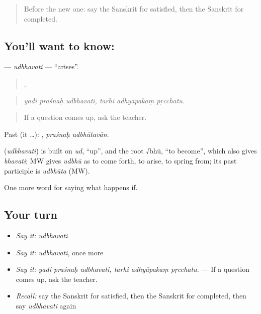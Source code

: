 \begin{quote}
Before the new one: say the Sanskrit for satisfied, then the Sanskrit for completed.
\end{quote}

\subsection*{You'll want to know: }
\textbf{} — \emph{udbhavati} — \textquotedblleft{}arises\textquotedblright{}.

\begin{quote}
  ,   
\end{quote}

\begin{quote}
\emph{yadi praśnaḥ udbhavati, tarhi adhyāpakaṃ pṛcchatu.}
\end{quote}

\begin{quote}
If a question comes up, ask the teacher.
\end{quote}

Past (it …):  , \emph{praśnaḥ udbhūtavān}.

\begin{cousinweb}
\textbf{} (\emph{udbhavati}) is built on \emph{ud}, \textquotedblleft{}up\textquotedblright{}, and the root √bhū, \textquotedblleft{}to become\textquotedblright{}, which also gives \emph{bhavati}; MW gives \emph{udbhū} as to come forth, to arise, to spring from; its past participle is \emph{udbhūta} (MW).
\end{cousinweb}

\begin{grammarlens}[title={What you've built}]
One more word for saying what happens if.
\end{grammarlens}

\subsection*{Your turn}
\begin{itemize}
\raggedright
  \item \emph{Say it:} \emph{udbhavati}
  \item \emph{Say it:} \emph{udbhavati}, once more
  \item \emph{Say it:} \emph{yadi praśnaḥ udbhavati, tarhi adhyāpakaṃ pṛcchatu.} — If a question comes up, ask the teacher.
  \item \emph{Recall:} say the Sanskrit for satisfied, then the Sanskrit for completed, then say \emph{udbhavati} again
\end{itemize}

